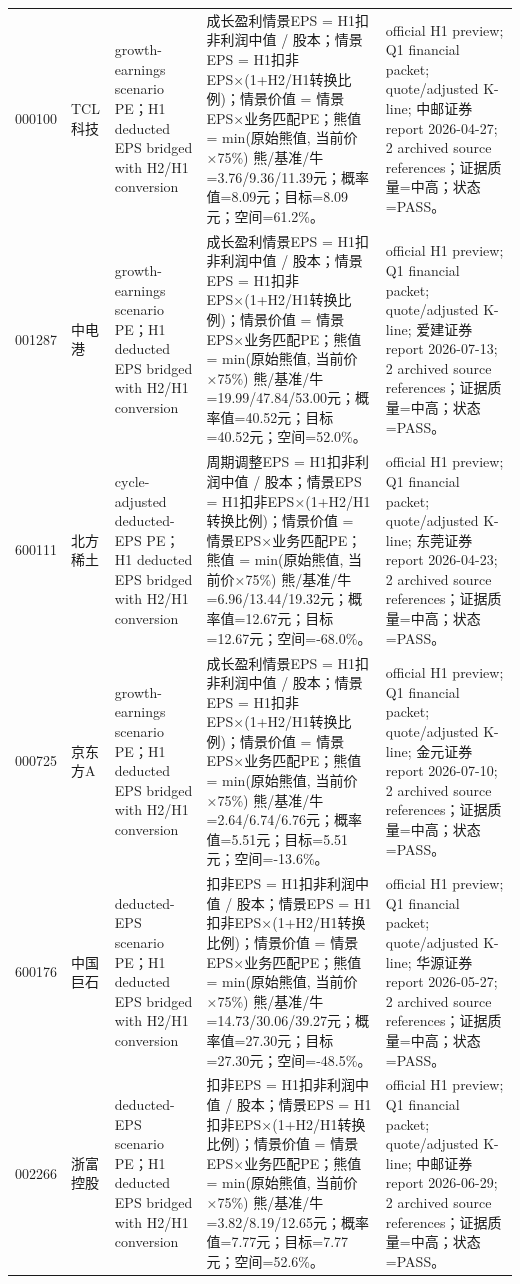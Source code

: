 \begin{longtable}{L{0.85cm}L{1.55cm}L{2.25cm}L{6.0cm}L{4.0cm}}
000100 & TCL科技 & growth-earnings scenario PE；H1 deducted EPS bridged with H2/H1 conversion & 成长盈利情景EPS = H1扣非利润中值 / 股本；情景EPS = H1扣非EPS×(1+H2/H1转换比例)；情景价值 = 情景EPS×业务匹配PE；熊值 = min(原始熊值, 当前价×75\%) 熊/基准/牛=3.76/9.36/11.39元；概率值=8.09元；目标=8.09元；空间=61.2\%。 & official H1 preview; Q1 financial packet; quote/adjusted K-line; 中邮证券 report 2026-04-27; 2 archived source references；证据质量=中高；状态=PASS。 \\
001287 & 中电港 & growth-earnings scenario PE；H1 deducted EPS bridged with H2/H1 conversion & 成长盈利情景EPS = H1扣非利润中值 / 股本；情景EPS = H1扣非EPS×(1+H2/H1转换比例)；情景价值 = 情景EPS×业务匹配PE；熊值 = min(原始熊值, 当前价×75\%) 熊/基准/牛=19.99/47.84/53.00元；概率值=40.52元；目标=40.52元；空间=52.0\%。 & official H1 preview; Q1 financial packet; quote/adjusted K-line; 爱建证券 report 2026-07-13; 2 archived source references；证据质量=中高；状态=PASS。 \\
600111 & 北方稀土 & cycle-adjusted deducted-EPS PE；H1 deducted EPS bridged with H2/H1 conversion & 周期调整EPS = H1扣非利润中值 / 股本；情景EPS = H1扣非EPS×(1+H2/H1转换比例)；情景价值 = 情景EPS×业务匹配PE；熊值 = min(原始熊值, 当前价×75\%) 熊/基准/牛=6.96/13.44/19.32元；概率值=12.67元；目标=12.67元；空间=-68.0\%。 & official H1 preview; Q1 financial packet; quote/adjusted K-line; 东莞证券 report 2026-04-23; 2 archived source references；证据质量=中高；状态=PASS。 \\
000725 & 京东方A & growth-earnings scenario PE；H1 deducted EPS bridged with H2/H1 conversion & 成长盈利情景EPS = H1扣非利润中值 / 股本；情景EPS = H1扣非EPS×(1+H2/H1转换比例)；情景价值 = 情景EPS×业务匹配PE；熊值 = min(原始熊值, 当前价×75\%) 熊/基准/牛=2.64/6.74/6.76元；概率值=5.51元；目标=5.51元；空间=-13.6\%。 & official H1 preview; Q1 financial packet; quote/adjusted K-line; 金元证券 report 2026-07-10; 2 archived source references；证据质量=中高；状态=PASS。 \\
600176 & 中国巨石 & deducted-EPS scenario PE；H1 deducted EPS bridged with H2/H1 conversion & 扣非EPS = H1扣非利润中值 / 股本；情景EPS = H1扣非EPS×(1+H2/H1转换比例)；情景价值 = 情景EPS×业务匹配PE；熊值 = min(原始熊值, 当前价×75\%) 熊/基准/牛=14.73/30.06/39.27元；概率值=27.30元；目标=27.30元；空间=-48.5\%。 & official H1 preview; Q1 financial packet; quote/adjusted K-line; 华源证券 report 2026-05-27; 2 archived source references；证据质量=中高；状态=PASS。 \\
002266 & 浙富控股 & deducted-EPS scenario PE；H1 deducted EPS bridged with H2/H1 conversion & 扣非EPS = H1扣非利润中值 / 股本；情景EPS = H1扣非EPS×(1+H2/H1转换比例)；情景价值 = 情景EPS×业务匹配PE；熊值 = min(原始熊值, 当前价×75\%) 熊/基准/牛=3.82/8.19/12.65元；概率值=7.77元；目标=7.77元；空间=52.6\%。 & official H1 preview; Q1 financial packet; quote/adjusted K-line; 中邮证券 report 2026-06-29; 2 archived source references；证据质量=中高；状态=PASS。 \\

\end{longtable}
